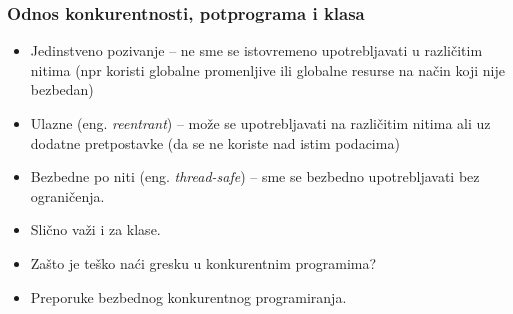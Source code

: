 \documentclass[../main.tex]{subfiles}
\begin{document}
\subsubsection{Odnos konkurentnosti, potprograma i klasa} 			%

\begin{itemize}
\item Jedinstveno pozivanje -- ne sme se istovremeno upotrebljavati u različitim nitima (npr koristi globalne promenljive ili globalne resurse na način koji nije bezbedan)
\item Ulazne (eng. {\it reentrant}) -- može se upotrebljavati na različitim nitima ali uz dodatne pretpostavke (da se ne koriste nad istim podacima)
\item Bezbedne po niti (eng. {\it thread-safe}) -- sme se bezbedno upotrebljavati bez ograničenja. 
\item Slično važi i za klase.
\item Zašto je teško naći gresku u konkurentnim programima?
\item Preporuke bezbednog konkurentnog programiranja.
\end{itemize}
\end{document}
